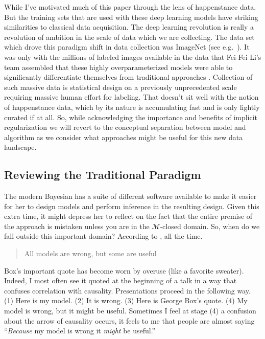 \documentclass[a4paperpaper,]{article}
\begin{document}
While I've motivated much of this paper through the lens of happenstance
data. But the training sets that are used with these deep learning
models have striking similarities to classical data acquisition. The
deep learning revolution is really a revolution of ambition in the scale
of data which we are collecting. The data set which drove this paradigm
shift in data collection was ImageNet (see
e.g.~\citet{Russakovsky-imagenet15}). It was only with the millions of
labeled images available in the data that Fei-Fei Li's team assembled
that these highly overparameterized models were able to significantly
differentiate themselves from traditional approaches
\citep{Krizhevsky:imagenet12}. Collection of such massive data is
statistical design on a previously unprecedented scale requiring massive
human effort for labeling. That doesn't sit well with the notion of
happenstance data, which by its nature is accumulating fast and is only
lightly curated if at all. So, while acknowledging the importance and
benefits of implicit regularization we will revert to the conceptual
separation between model and algorithm as we consider what approaches
might be useful for this new data landscape.

\hypertarget{reviewing-the-traditional-paradigm}{%
\subsection{Reviewing the Traditional
Paradigm}\label{reviewing-the-traditional-paradigm}}

The modern Bayesian has a suite of different software available to make
it easier for her to design models and perform inference in the
resulting design. Given this extra time, it might depress her to reflect
on the fact that the entire premise of the approach is mistaken unless
you are in the \(\mathcal{M}\)-closed domain. So, when do we fall
outside this important domain? According to \citet{Box:science76}, all
the time.

\begin{quote}
All models are wrong, but some are useful
\end{quote}

Box's important quote has become worn by overuse (like a favorite
sweater). Indeed, I most often see it quoted at the beginning of a talk
in a way that confuses correlation with causality. Presentations proceed
in the following way. (1) Here is my model. (2) It is wrong. (3) Here is
George Box's quote. (4) My model is wrong, but it might be useful.
Sometimes I feel at stage (4) a confusion about the arrow of causality
occurs, it feels to me that people are almost saying ``\emph{Because} my
model is wrong it \emph{might} be useful.''
\end{document}
